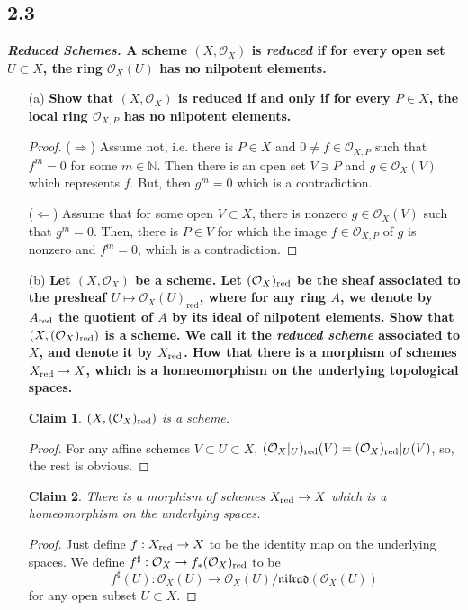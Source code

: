 \documentclass[11pt]{amsart}          %
\newcommand{\calO}{\mathcal{O}}
\newtheorem*{claim}{Claim}
\begin{document}
\subsection*{2.3}\textbf{ {\it Reduced Schemes.} A scheme $(X, \calO_X)$ is {\it reduced} if for every open set $U \subset X$, the ring $\calO_X (U)$ has no nilpotent elements.}
\begin{enumerate}
\item [(a)] \textbf{Show that $(X, \calO_X)$ is reduced if and only if for every $P \in X$, the local ring $\calO_{X, P}$ has no nilpotent elements.}

\begin{proof}($\Rightarrow$) Assume not, i.e. there is $P \in X$ and $0 \not = f \in \calO_{X, P}$ such that $f^m = 0$ for some $m \in \mathbb{N}$. Then there is an open set $V \ni P$ and $g \in \calO_{X } (V)$ which represents $f$. But, then $g^m = 0$ which is a contradiction.

($\Leftarrow$) Assume that for some open $V \subset X$, there is nonzero $g \in \calO_X (V)$ such that $g^m=0$. Then, there is $P \in V$ for which the image $f \in \calO_{X,P}$ of $g$ is nonzero and $f^m = 0$, which is a contradiction.\end{proof}

\item [(b)] \textbf{Let $(X, \calO_X)$ be a scheme. Let $(\calO_X)_{{\rm red}}$ be the sheaf associated to the presheaf $U \mapsto \calO_X (U)_{\mbox{red}}$, where for any ring $A$, we denote by $A_{{\rm red}}$ the quotient of $A$ by its ideal of nilpotent elements. Show that $(X, (\calO_X)_{{\rm red}})$ is a scheme. We call it the {\it reduced scheme} associated to $X$, and denote it by $X_{{\rm red}}$. How that there is a morphism of schemes $X_{{\rm red}} \to X$, which is a homeomorphism on the underlying topological spaces.}

\begin{claim} $(X, (\calO_X)_{{\rm red}})$ is a scheme.\end{claim}
\begin{proof}For any affine schemes $V \subset U \subset X$, $(\calO_X |_U) _{{\rm red}} (V) = (\calO_X)_{{\rm red}} |_U (V)$, so, the rest is obvious.\end{proof}

\begin{claim} There is a morphism of schemes $X _{\rm red} \to X$ which is a homeomorphism on the underlying spaces.\end{claim}
\begin{proof}Just define $f: X_{\rm red} \to X$ to be the identity map on the underlying spaces. We define $f^{\sharp}: \calO_X \to f_* (\calO_X)_{\rm red}$ to be $$f^{\sharp} (U): \calO_X (U) \to \calO_X (U) / \mathfrak{nilrad}(\calO_X (U))$$ for any open subset $U \subset X$.\end{proof}


\end{enumerate}
\end{document}
